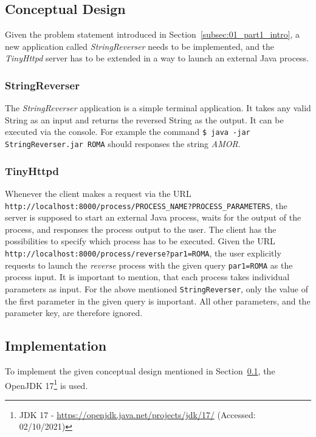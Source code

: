 \documentclass{article}
\def\Sec#1{Section~\ref{#1}}
\begin{document}
\subsection{Conceptual Design}\label{subsec:01_part1_design}
Given the problem statement introduced in \Sec{subsec:01_part1_intro}, a new application called \textit{StringReverser} needs to be implemented, and the \textit{TinyHttpd} server has to be extended in a way to launch an external Java process.

\subsubsection{StringReverser}\label{subsubsec:01_part1_design_stringreverser}
The \textit{StringReverser} application is a simple terminal application. It takes any valid String as an input and returns the reversed String as the output. It can be executed via the console. For example the command \texttt{\$ java -jar StringReverser.jar ROMA} should responses the string \textit{AMOR}.

\subsubsection{TinyHttpd}\label{subsubsec:01_part1_design_tinyhttpd}
Whenever the client makes a request via the URL \texttt{http://localhost:8000/process/PROCESS\_NAME?PROCESS\_PARAMETERS}, the server is supposed to start an external Java process, waits for the output of the process, and responses the process output to the user.
The client has the possibilities to specify which process has to be executed. Given the URL \texttt{http://localhost:8000/process/reverse?par1=ROMA}, the user explicitly requests to launch the \textit{reverse} process with the given query \texttt{par1=ROMA} as the process input.
It is important to mention, that each process takes individual parameters as input. For the above mentioned \texttt{StringReverser}, only the value of the first parameter in the given query is important. All other parameters, and the parameter key, are therefore ignored.

\subsection{Implementation}\label{subsec:01_part1_impl}
To implement the given conceptual design mentioned in \Sec{subsec:01_part1_design}, the OpenJDK 17\footnote{JDK 17 - \url{https://openjdk.java.net/projects/jdk/17/} (Accessed: 02/10/2021)} is used.
\end{document}

